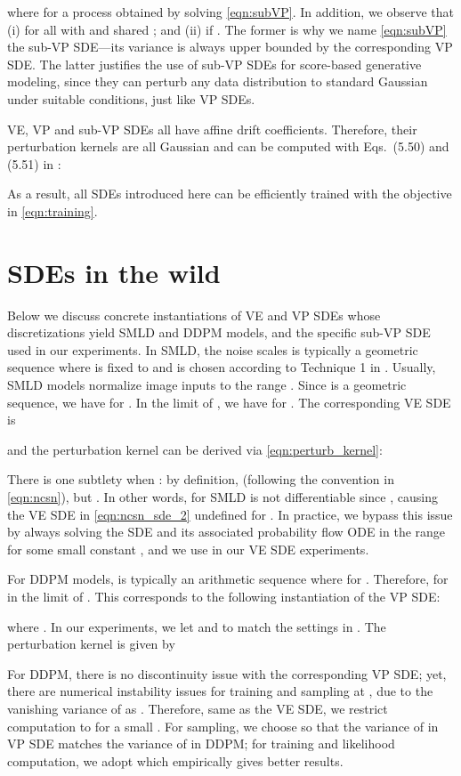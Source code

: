 \documentclass{article} \usepackage{iclr2021_conference,times}
\begin{document}
where  for a process  obtained by solving \cref{eqn:subVP}. In addition, we observe that (i)  for all  with  and shared ; and (ii)  if . The former is why we name \cref{eqn:subVP} the sub-VP SDE---its variance is always upper bounded by the corresponding VP SDE. The latter justifies the use of sub-VP SDEs for score-based generative modeling, since they can perturb any data distribution to standard Gaussian under suitable conditions, just like VP SDEs.


VE, VP and sub-VP SDEs all have affine drift coefficients. Therefore, their perturbation kernels  are all Gaussian and can be computed with Eqs.~(5.50) and (5.51) in \citet{sarkka2019applied}:

As a result, all SDEs introduced here can be efficiently trained with the objective in \cref{eqn:training}.

\section{SDEs in the wild} \label{app:wild_sde}
Below we discuss concrete instantiations of VE and VP SDEs whose discretizations yield SMLD and DDPM models, and the specific sub-VP SDE used in our experiments. In SMLD, the noise scales  is typically a geometric sequence where  is fixed to  and  is chosen according to Technique 1 in \citet{song2020improved}. Usually, SMLD models normalize image inputs to the range . Since  is a geometric sequence, we have  for . In the limit of , we have  for . The corresponding VE SDE is

and the perturbation kernel can be derived via \cref{eqn:perturb_kernel}:

There is one subtlety when : by definition,  (following the convention in \cref{eqn:ncsn}), but . In other words,  for SMLD is not differentiable since , causing the VE SDE in \cref{eqn:ncsn_sde_2} undefined for . In practice, we bypass this issue by always solving the SDE and its associated probability flow ODE in the range  for some small constant , and we use  in our VE SDE experiments. 

For DDPM models,  is typically an arithmetic sequence where  for . Therefore,  for  in the limit of . This corresponds to the following instantiation of the VP SDE:

where . In our experiments, we let  and  to match the settings in \citet{ho2020denoising}. The perturbation kernel is given by

For DDPM, there is no discontinuity issue with the corresponding VP SDE; yet, there are numerical instability issues for training and sampling at , due to the vanishing variance of  as . Therefore, same as the VE SDE, we restrict computation to  for a small . For sampling, we choose  so that the variance of  in VP SDE matches the variance of  in DDPM; for training and likelihood computation, we adopt  which empirically gives better results.
\end{document}

